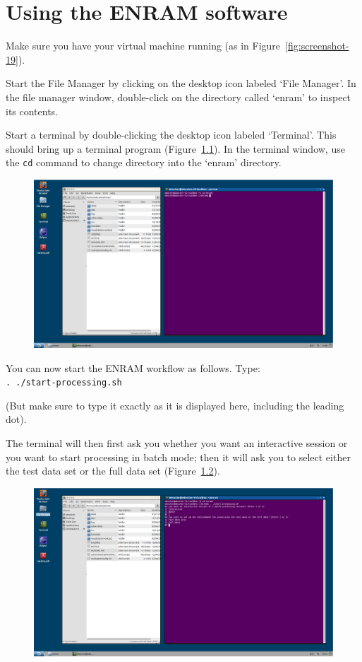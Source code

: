 \chapter{Using the ENRAM software}

Make sure you have your virtual machine running (as in Figure~\ref{fig:screenshot-19}). 

Start the File Manager by clicking on the desktop icon labeled `File Manager'. In the file manager window, double-click on the directory called `enram' to inspect its contents.

Start a terminal by double-clicking the desktop icon labeled `Terminal'. This should bring up a terminal program (Figure~\ref{fig:screenshot-24}). In the terminal window, use the \texttt{cd} command to change directory into the `enram' directory. 

\begin{figure}[ht]
  \centering
    \includegraphics[width=0.85\linewidth , keepaspectratio]{./../eps/screenshot-24.eps}
  \caption{}
  \label{fig:screenshot-24}
\end{figure}


You can now start the ENRAM workflow as follows. Type:\\
\texttt{. ./start-processing.sh}

(But make sure to type it exactly as it is displayed here, including the leading dot).

The terminal will then first ask you whether you want an interactive session or you want to start processing in batch mode; then it will ask you to select either the test data set or the full data set (Figure~\ref{fig:screenshot-25}).

\begin{figure}[ht]
  \centering
    \includegraphics[width=0.85\linewidth , keepaspectratio]{./../eps/screenshot-25.eps}
  \caption{}
  \label{fig:screenshot-25}
\end{figure}


